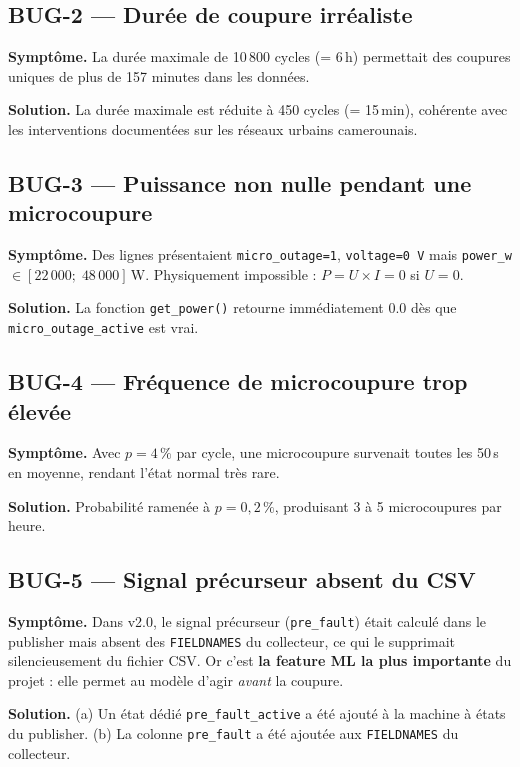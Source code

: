 \documentclass[12pt,a4paper]{article}
\begin{document}
\subsection*{BUG-2 — Durée de coupure irréaliste}

\textbf{Symptôme.} La durée maximale de 10\,800 cycles (= 6\,h) permettait des
coupures uniques de plus de 157 minutes dans les données.

\textbf{Solution.} La durée maximale est réduite à 450 cycles (= 15\,min), cohérente
avec les interventions documentées sur les réseaux urbains camerounais.

\subsection*{BUG-3 — Puissance non nulle pendant une microcoupure}

\textbf{Symptôme.} Des lignes présentaient \texttt{micro\_outage=1}, \texttt{voltage=0\,V}
mais \texttt{power\_w} $\in [22\,000;\; 48\,000]$\,W. Physiquement impossible :
$P = U \times I = 0$ si $U = 0$.

\textbf{Solution.} La fonction \texttt{get\_power()} retourne immédiatement 0.0
dès que \texttt{micro\_outage\_active} est vrai.

\subsection*{BUG-4 — Fréquence de microcoupure trop élevée}

\textbf{Symptôme.} Avec $p = 4\,\%$ par cycle, une microcoupure survenait toutes
les 50\,s en moyenne, rendant l'état normal très rare.

\textbf{Solution.} Probabilité ramenée à $p = 0{,}2\,\%$, produisant 3 à 5
microcoupures par heure.

\subsection*{BUG-5 — Signal précurseur absent du CSV}

\textbf{Symptôme.} Dans v2.0, le signal précurseur (\texttt{pre\_fault}) était calculé
dans le publisher mais absent des \texttt{FIELDNAMES} du collecteur, ce qui le
supprimait silencieusement du fichier CSV. Or c'est \textbf{la feature ML la plus
importante} du projet : elle permet au modèle d'agir \textit{avant} la coupure.

\textbf{Solution.} (a) Un état dédié \texttt{pre\_fault\_active} a été ajouté à
la machine à états du publisher. (b) La colonne \texttt{pre\_fault} a été ajoutée
aux \texttt{FIELDNAMES} du collecteur.
\end{document}
